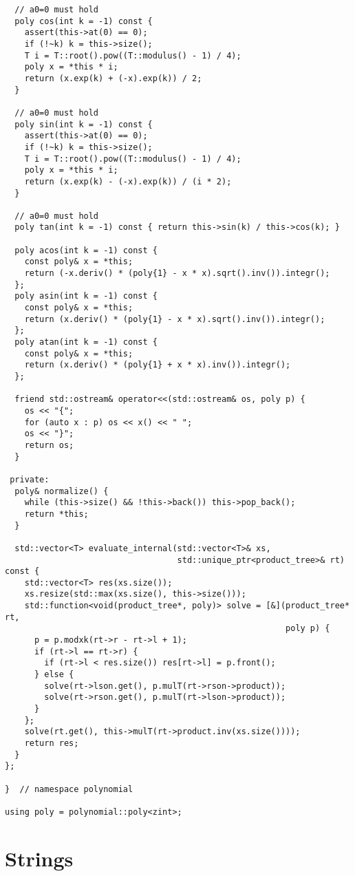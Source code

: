 \documentclass{article}
\begin{document}
\begin{lstlisting}
  // a0=0 must hold
  poly cos(int k = -1) const {
    assert(this->at(0) == 0);
    if (!~k) k = this->size();
    T i = T::root().pow((T::modulus() - 1) / 4);
    poly x = *this * i;
    return (x.exp(k) + (-x).exp(k)) / 2;
  }

  // a0=0 must hold
  poly sin(int k = -1) const {
    assert(this->at(0) == 0);
    if (!~k) k = this->size();
    T i = T::root().pow((T::modulus() - 1) / 4);
    poly x = *this * i;
    return (x.exp(k) - (-x).exp(k)) / (i * 2);
  }

  // a0=0 must hold
  poly tan(int k = -1) const { return this->sin(k) / this->cos(k); }

  poly acos(int k = -1) const {
    const poly& x = *this;
    return (-x.deriv() * (poly{1} - x * x).sqrt().inv()).integr();
  };
  poly asin(int k = -1) const {
    const poly& x = *this;
    return (x.deriv() * (poly{1} - x * x).sqrt().inv()).integr();
  };
  poly atan(int k = -1) const {
    const poly& x = *this;
    return (x.deriv() * (poly{1} + x * x).inv()).integr();
  };

  friend std::ostream& operator<<(std::ostream& os, poly p) {
    os << "{";
    for (auto x : p) os << x() << " ";
    os << "}";
    return os;
  }

 private:
  poly& normalize() {
    while (this->size() && !this->back()) this->pop_back();
    return *this;
  }

  std::vector<T> evaluate_internal(std::vector<T>& xs,
                                   std::unique_ptr<product_tree>& rt) const {
    std::vector<T> res(xs.size());
    xs.resize(std::max(xs.size(), this->size()));
    std::function<void(product_tree*, poly)> solve = [&](product_tree* rt,
                                                         poly p) {
      p = p.modxk(rt->r - rt->l + 1);
      if (rt->l == rt->r) {
        if (rt->l < res.size()) res[rt->l] = p.front();
      } else {
        solve(rt->lson.get(), p.mulT(rt->rson->product));
        solve(rt->rson.get(), p.mulT(rt->lson->product));
      }
    };
    solve(rt.get(), this->mulT(rt->product.inv(xs.size())));
    return res;
  }
};

}  // namespace polynomial

using poly = polynomial::poly<zint>;
\end{lstlisting}

\section{Strings}
\end{document}
